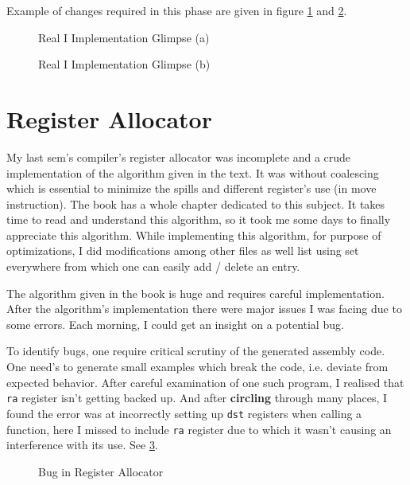 Example of changes required in this phase are given in figure \ref{fig:rphi1} and \ref{fig:rphi2}.

\begin{figure}
\centering
{}
\caption{Real I Implementation Glimpse (a)}
\label{fig:rphi1}
\end{figure}

\begin{figure}
\centering
{}
\caption{Real I Implementation Glimpse (b)}
\label{fig:rphi2}
\end{figure}

\section{Register Allocator}

My last sem's compiler's register allocator was incomplete and a crude implementation of the algorithm given in the text. It was without coalescing which is essential to minimize the spills and different register's use (in move instruction). The book has a whole chapter dedicated to this subject. It takes time to read and understand this algorithm, so it took me some days to finally appreciate this algorithm. While implementing this algorithm, for purpose of optimizations, I did modifications among other files as well list using set everywhere from which one can easily add / delete an entry. 

The algorithm given in the book is huge and requires careful implementation. After the algorithm's implementation there were major issues I was facing due to some errors. Each morning, I could get an insight on a potential bug. 

To identify bugs, one require critical scrutiny of the generated assembly code. One need's to generate small examples which break the code, i.e. deviate from expected behavior. After careful examination of one such program, I realised that \texttt{ra} register isn't getting backed up. And after \textbf{circling} through many places, I found the error was at incorrectly setting up \texttt{dst} registers when calling a function, here I missed to include \texttt{ra} register due to which it wasn't causing an interference with its use. See \ref{fig:eb}.

\begin{figure}
\centering
{}
\caption{Bug in Register Allocator}
\label{fig:eb}
\end{figure}

